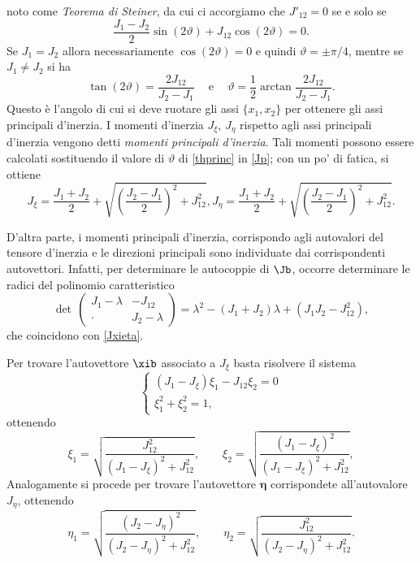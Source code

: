 noto come\textit{ Teorema di Steiner}, da cui ci accorgiamo che $	J'_{12}=0$ se e solo se 
\begin{equation}
\frac{J_{1}-J_{2}}{2}\sin(2\vartheta)+J_{12}\cos(2\vartheta)=0.
\end{equation}
Se $J_1=J_2$ allora necessariamente $\cos(2\vartheta)=0$ e quindi $\vartheta=\pm \pi/4$, mentre se $J_1\neq J_2$ si ha
\begin{equation}\label{thprinc}
	\tan(2\vartheta)=\frac{2J_{12}}{J_{2}-J_{1}}\quad\mathrm{~e~}\quad\vartheta=\frac{1}{2}\arctan\frac{2J_{12}}{J_{2}-J_{1}}.
\end{equation}
Questo è l’angolo di cui si deve ruotare gli assi $\{x_1,x_2\}$ per ottenere gli assi principali d’inerzia.  I momenti d’inerzia $J_\xi$, $J_\eta$ rispetto agli assi principali d’inerzia vengono detti\textit{ momenti principali d’inerzia}. Tali momenti possono essere calcolati sostituendo il valore di $\vartheta$ di \eqref{thprinc} in \eqref{Jp}; con un po' di fatica, si ottiene
\begin{equation}\label{Jxieta}
	J_\xi=\frac{J_1+J_2}2+\sqrt{\left(\frac{J_2-J_1}2\right)^2+J_{12}^2}, 	J_\eta=\frac{J_1+J_2}2+\sqrt{\left(\frac{J_2-J_1}2\right)^2+J_{12}^2}.
\end{equation}

D'altra parte, i momenti principali d'inerzia, corrispondo agli autovalori del tensore d'inerzia e le direzioni principali sono individuate dai corrispondenti autovettori.
Infatti, per determinare le autocoppie di $\Jb$, occorre determinare le radici del polinomio caratteristico
\begin{equation}
\det\,	\begin{pmatrix}J_1-\lambda&-J_{12}\\\cdot&J_\mathrm{2}-\lambda\end{pmatrix}=\lambda^2-(J_{1}+J_{2})\lambda+(J_{1}J_2-J_{12}^2),
\end{equation}
che coincidono con \eqref{Jxieta}.

Per trovare l'autovettore $\xib$ associato a $J_\xi$ basta risolvere il sistema
\begin{equation}
\begin{cases}
(J_1-J_\xi)\xi_1-J_{12}\xi_2=0\\
\xi_1^2+\xi_2^2=1,
\end{cases}
\end{equation}
ottenendo
\begin{equation}
\xi_1=\sqrt{\frac{J_{12}^2}{(J_1-J_\xi)^2+J_{12}^2}}, \qquad \xi_2=\sqrt{\frac{(J_1-J_\xi)^2}{(J_1-J_\xi)^2+J_{12}^2}}, 
\end{equation}
Analogamente si procede per trovare l'autovettore $\boldsymbol{\eta}$ corrispondete all'autovalore $J_\eta$, ottenendo
\begin{equation}
 \eta_1=\sqrt{\frac{(J_2-J_\eta)^2}{(J_2-J_\eta)^2+J_{12}^2}},  \qquad
	\eta_2=\sqrt{\frac{J_{12}^2}{(J_2-J_\eta)^2+J_{12}^2}}. 
\end{equation}

